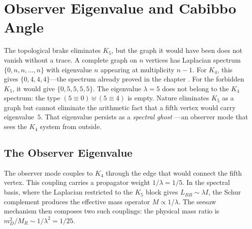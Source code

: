 \documentclass[11pt,a4paper]{book}
\begin{document}

\chapter{Observer Eigenvalue and Cabibbo Angle}
\label{ch:observer-cabibbo}

The topological brake eliminates $K_5$, but the graph it would have been
does not vanish without a trace.  A complete graph on $n$ vertices has
Laplacian spectrum $\{0, n, n, \ldots, n\}$ with eigenvalue $n$ appearing
at multiplicity $n - 1$.  For $K_4$, this gives $\{0, 4, 4, 4\}$---the
spectrum already proved in the chapter \emph{}.  For the
forbidden $K_5$, it would give $\{0, 5, 5, 5, 5\}$.  The eigenvalue
$\lambda = 5$ does not belong to the $K_4$ spectrum: the type
$(5 ) \uplus (5 )$ is empty.  Nature eliminates $K_5$ as
a graph but cannot eliminate the arithmetic fact that a fifth vertex would
carry eigenvalue~$5$.  That eigenvalue persists as a \emph{spectral ghost}%
---an observer mode that sees the $K_4$ system from outside.

\section{The Observer Eigenvalue}

The observer mode couples to $K_4$ through the edge that would connect the
fifth vertex.  This coupling carries a propagator weight $1/\lambda = 1/5$.
In the spectral basis, where the Laplacian restricted to the $K_5$ block
gives $L_{BB} \sim \lambda I$, the Schur complement produces the effective
mass operator $M /\lambda$.  The seesaw mechanism then composes
two such couplings: the physical mass ratio is $m_D^2 / M_R \sim
1/\lambda^2 = 1/25$.
\end{document}
